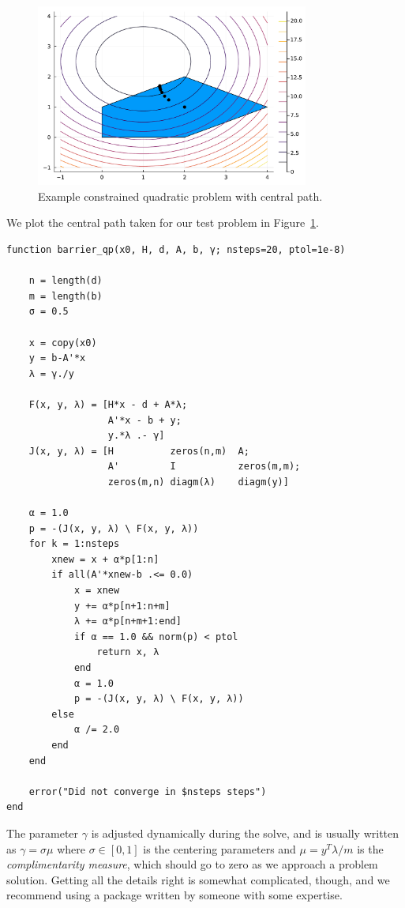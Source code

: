 \documentclass[12pt, leqno]{article} %
\begin{document}
\begin{figure}
\begin{center}
\includegraphics[width=0.8\textwidth]{fig/2023-04-28-ex16_3-ip.pdf}
\end{center}
\caption{Example constrained quadratic problem with central path.}
\label{fig:test-qp-ip}
\end{figure}

We plot the central path taken for our test problem in
Figure~\ref{fig:test-qp-ip}.

\begin{verbatim}
function barrier_qp(x0, H, d, A, b, γ; nsteps=20, ptol=1e-8)

    n = length(d)
    m = length(b)
    σ = 0.5

    x = copy(x0)
    y = b-A'*x
    λ = γ./y

    F(x, y, λ) = [H*x - d + A*λ;
                  A'*x - b + y;
                  y.*λ .- γ]
    J(x, y, λ) = [H          zeros(n,m)  A;
                  A'         I           zeros(m,m);
                  zeros(m,n) diagm(λ)    diagm(y)]

    α = 1.0
    p = -(J(x, y, λ) \ F(x, y, λ))
    for k = 1:nsteps
        xnew = x + α*p[1:n]
        if all(A'*xnew-b .<= 0.0)
            x = xnew
            y += α*p[n+1:n+m]
            λ += α*p[n+m+1:end]
            if α == 1.0 && norm(p) < ptol
                return x, λ
            end
            α = 1.0
            p = -(J(x, y, λ) \ F(x, y, λ))
        else
            α /= 2.0
        end
    end

    error("Did not converge in $nsteps steps")
end
\end{verbatim}

The parameter \(\gamma\) is adjusted dynamically during the solve, and
is usually written as \(\gamma = \sigma \mu\) where \(\sigma \in [0,1]\)
is the centering parameters and \(\mu = y^T \lambda / m\) is the
\emph{complimentarity measure}, which should go to zero as we approach a
problem solution. Getting all the details right is somewhat complicated,
though, and we recommend using a package written by someone with some
expertise.
\end{document}
